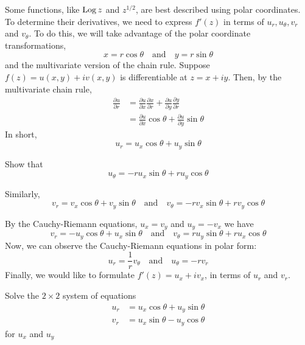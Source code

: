 \documentclass[handout]{ximera}
\begin{document}
Some functions, like $\operatorname{Log} z$ and $z^{1/2}$, are best described using polar coordinates. 
To determine their derivatives, we need 
to express $f'(z)$ in terms of $u_r, u_\theta, v_r$ and $v_\theta$. 
To do this, we will take advantage of the polar coordinate transformations,
\[
x = r\cos \theta \quad \mbox{and} \quad y=r\sin \theta
\]
and the multivariate version of the chain rule.
Suppose $f(z) = u(x,y) + iv(x,y)$ is differentiable at $z = x+iy$.
Then, by the multivariate chain rule,
\begin{align*}
\frac{\partial u}{\partial r} &= \frac{\partial u}{\partial x}\frac{\partial x}{\partial r}+\frac{\partial u}{\partial y}\frac{\partial y}{\partial r}\\
                              &= \frac{\partial u}{\partial x} \cos\theta + \frac{\partial u}{\partial y} \sin \theta
\end{align*}
In short,
\[
u_r = u_x \cos \theta + u_y \sin\theta
\]


\begin{problem}
Show that
\[
u_\theta = -ru_x \sin \theta + ru_y \cos\theta
\]
\end{problem}


Similarly,
\[
 v_r = v_x \cos \theta + v_y \sin\theta \quad \mbox{and} \quad  v_\theta = -rv_x \sin \theta + rv_y \cos\theta
\]

By the Cauchy-Riemann equations, $u_x = v_y$ and $u_y = -v_x$ we have
\[
v_r = -u_y \cos \theta + u_x \sin\theta \quad \mbox{and} \quad  v_\theta = ru_y \sin \theta + ru_x \cos\theta
\]
Now, we can observe the Cauchy-Riemann equations in polar form:
\[
u_r = \frac{1}{r} v_\theta \quad \mbox{and} \quad u_\theta = -rv_r
\]
Finally, we would like to formulate $f'(z) = u_x + iv_x$, in terms of $u_r$ and $v_r$.


\begin{problem} Solve the $2 \times 2$ system of equations
\begin{align*}
u_r &= u_x \cos \theta + u_y \sin\theta\\
v_r &= u_x \sin \theta -u_y \cos\theta
\end{align*}
for $u_x$ and $u_y$
\begin{multipleChoice}
\end{multipleChoice}
\end{problem}
\end{document}
